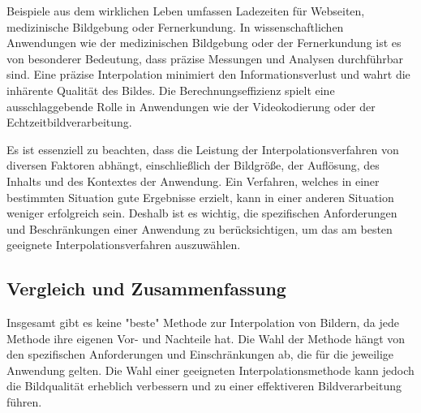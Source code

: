 Beispiele aus dem wirklichen Leben umfassen Ladezeiten für Webseiten, medizinische Bildgebung oder Fernerkundung.
In wissenschaftlichen Anwendungen wie der medizinischen Bildgebung oder der Fernerkundung ist es von besonderer Bedeutung, dass präzise Messungen und Analysen durchführbar sind.
Eine präzise Interpolation minimiert den Informationsverlust und wahrt die inhärente Qualität des Bildes.
Die Berechnungseffizienz spielt eine ausschlaggebende Rolle in Anwendungen wie der Videokodierung oder der Echtzeitbildverarbeitung.

Es ist essenziell zu beachten, dass die Leistung der Interpolationsverfahren von diversen Faktoren abhängt, einschließlich der Bildgröße, der Auflösung, des Inhalts und des Kontextes der Anwendung.
Ein Verfahren, welches in einer bestimmten Situation gute Ergebnisse erzielt, kann in einer anderen Situation weniger erfolgreich sein.
Deshalb ist es wichtig, die spezifischen Anforderungen und Beschränkungen einer Anwendung zu berücksichtigen, um das am besten geeignete Interpolationsverfahren auszuwählen.

\subsection{Vergleich und Zusammenfassung}

Insgesamt gibt es keine "beste" Methode zur Interpolation von Bildern, da jede Methode ihre eigenen Vor- und Nachteile hat. 
Die Wahl der Methode hängt von den spezifischen Anforderungen und Einschränkungen ab, die für die jeweilige Anwendung gelten. 
Die Wahl einer geeigneten Interpolationsmethode kann jedoch die Bildqualität erheblich verbessern und zu einer effektiveren Bildverarbeitung führen.
\newpage